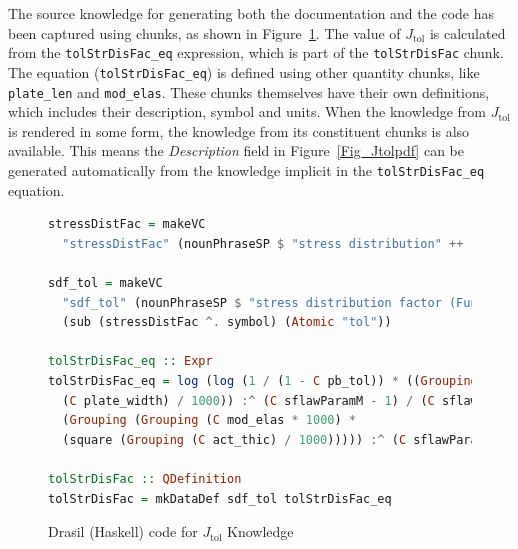 \documentclass[sigconf]{acmart}
\newcommand{\authornt}[3]{\textcolor{#1}{[#3 ---#2]}}
\newcommand{\authornt}[3]{}
\newcommand{\ds}[1]{\authornt{red}{DS}{#1}} %
\newcommand{\jc}[1]{\authornt{magenta}{JC}{#1}} %
\newcommand{\spr}[1]{\authornt{green}{SP}{#1}} %
\newcommand{\jtol}{$J_{\mbox{tol}}$}
\newcommand{\inlHask}[1]{\lstinline[language=Haskell, columns=fullflexible,
  basicstyle=\ttfamily, showstringspaces=false, breaklines=true]{#1}}
\begin{document}


The source knowledge for generating both the documentation and the code has been
captured using chunks, as shown in Figure~\ref{Fig_JtolDrasil}. The value of
\jtol{} is calculated from the {\inlHask{tolStrDisFac_eq}} expression, which is
part of the {\inlHask{tolStrDisFac}} chunk.  The equation ({\inlHask{tolStrDisFac_eq}}) is
defined using other quantity chunks, like {\inlHask{plate_len}} and
{\inlHask{mod_elas}}.  These chunks themselves have their own definitions, which
includes their description, symbol and units.  When the knowledge from \jtol{} is
rendered in some form, the knowledge from its constituent chunks is also
available.  This means the \emph{Description} field in Figure~\ref{Fig_Jtolpdf} 
can be generated automatically from the knowledge implicit in the 
{\inlHask{tolStrDisFac_eq}} equation.

\begin{figure}
\begin{lstlisting}[language=Haskell, frame=single, showstringspaces=false, basicstyle=\small] 
stressDistFac = makeVC 
  "stressDistFac" (nounPhraseSP $ "stress distribution" ++ " factor (Function)") cJ

sdf_tol = makeVC 
  "sdf_tol" (nounPhraseSP $ "stress distribution factor (Function) based on Pbtol") 
  (sub (stressDistFac ^. symbol) (Atomic "tol"))

tolStrDisFac_eq :: Expr
tolStrDisFac_eq = log (log (1 / (1 - C pb_tol)) * ((Grouping ((C plate_len / 1000) * 
  (C plate_width) / 1000)) :^ (C sflawParamM - 1) / (C sflawParamK * 
  (Grouping (Grouping (C mod_elas * 1000) * 
  (square (Grouping (C act_thic) / 1000))))) :^ (C sflawParamM) * (C loadDF))))

tolStrDisFac :: QDefinition
tolStrDisFac = mkDataDef sdf_tol tolStrDisFac_eq
\end{lstlisting}
\caption{Drasil (Haskell) code for \jtol{} Knowledge}
\label{Fig_JtolDrasil}
\end{figure}
\end{document}
